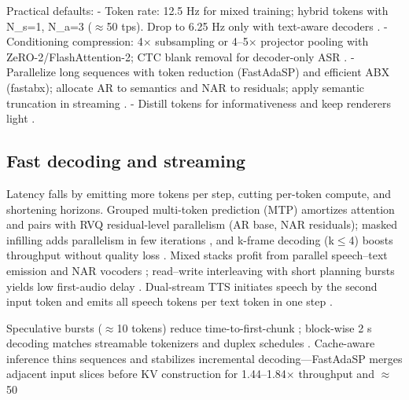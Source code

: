 \documentclass{article}
\begin{document}
Practical defaults:
- Token rate: 12.5 Hz for mixed training; hybrid tokens with N_s=1, N_a=3 ($\approx$50 tps). Drop to 6.25 Hz only with text-aware decoders \cite{yang2025diffsoundstreamefficientspeechtokenizati,wang2025tadicodectextawarediffusionspeechtokeniz}.
- Conditioning compression: 4$\times$ subsampling or 4--5$\times$ projector pooling with ZeRO-2/FlashAttention-2; CTC blank removal for decoder-only ASR \cite{wang2023slmbridgethingapbetweenspeechtextfoundat,nguyen2025qwenvsgemmaintegrationwhispercomparative,tsunoo2024decoderonlyarchitecturespeechrecognition}.
- Parallelize long sequences with token reduction (FastAdaSP) and efficient ABX (fastabx); allocate AR to semantics and NAR to residuals; apply semantic truncation in streaming \cite{lu2024fastadaspmultitaskadaptedefficientinfere,poli2025fastabxlibraryefficientcomputationabxdis}.
- Distill tokens for informativeness and keep renderers light \cite{ahasan2025dmcodecdistillingmultimodalrepresentatio,wang2025tadicodectextawarediffusionspeechtokeniz}.

\subsection{Fast decoding and streaming} \label{subsec:fastdecodingandstreaming}
Latency falls by emitting more tokens per step, cutting per-token compute, and shortening horizons. Grouped multi-token prediction (MTP) amortizes attention and pairs with RVQ residual-level parallelism (AR base, NAR residuals); masked infilling adds parallelism in few iterations \cite{li2024masksrmaskedlanguagemodelfullbandspeechr}, and k-frame decoding (k$\leq$4) boosts throughput without quality loss \cite{bai2025dmelspeechtokenizationmadesimple}. Mixed stacks profit from parallel speech--text emission and NAR vocoders \cite{tan2025drvoiceparallelspeechtextvoiceconversati}; read--write interleaving with short planning bursts yields low first-audio delay \cite{fang2025llamaomni2llmbasedrealtimespokenchatbota}. Dual-stream TTS initiates speech by the second input token and emits all speech tokens per text token in one step \cite{sheng2025syncspeechlowlatencyefficientdualstreamt}.

Speculative bursts ($\approx$10 tokens) reduce time-to-first-chunk \cite{long2025vitaaudiofastinterleavedcrossmodaltokeng}; block-wise 2 s decoding matches streamable tokenizers and duplex schedules \cite{zeng2024scalingspeechtextpretrainingsyntheticint}. Cache-aware inference thins sequences and stabilizes incremental decoding---FastAdaSP merges adjacent input slices before KV construction for 1.44--1.84$\times$ throughput and $\approx$50%
\end{document}
